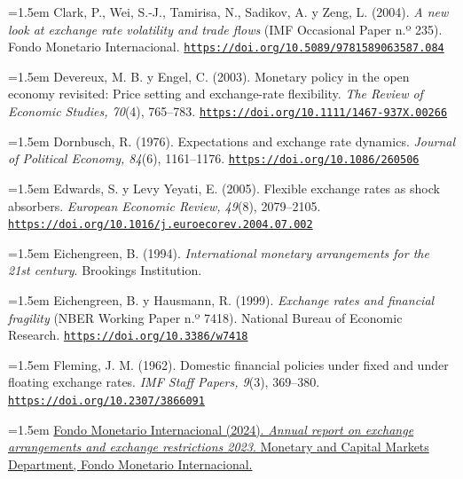 \documentclass[10pt,a4paper]{article}
\begin{document}
\noindent\hangindent=1.5em Clark, P., Wei, S.-J., Tamirisa, N., Sadikov, A. y Zeng, L. (2004). \textit{A new look at exchange rate volatility and trade flows} (IMF Occasional Paper n.º 235). Fondo Monetario Internacional. \href{https://doi.org/10.5089/9781589063587.084}{\nolinkurl{https://doi.org/10.5089/9781589063587.084}}

\noindent\hangindent=1.5em Devereux, M. B. y Engel, C. (2003). Monetary policy in the open economy revisited: Price setting and exchange-rate flexibility. \textit{The Review of Economic Studies, 70}(4), 765--783. \href{https://doi.org/10.1111/1467-937X.00266}{\nolinkurl{https://doi.org/10.1111/1467-937X.00266}}

\noindent\hangindent=1.5em Dornbusch, R. (1976). Expectations and exchange rate dynamics. \textit{Journal of Political Economy, 84}(6), 1161--1176. \href{https://doi.org/10.1086/260506}{\nolinkurl{https://doi.org/10.1086/260506}}

\noindent\hangindent=1.5em Edwards, S. y Levy Yeyati, E. (2005). Flexible exchange rates as shock absorbers. \textit{European Economic Review, 49}(8), 2079--2105. \href{https://doi.org/10.1016/j.euroecorev.2004.07.002}{\nolinkurl{https://doi.org/10.1016/j.euroecorev.2004.07.002}}

\noindent\hangindent=1.5em Eichengreen, B. (1994). \textit{International monetary arrangements for the 21st century}. Brookings Institution.

\noindent\hangindent=1.5em Eichengreen, B. y Hausmann, R. (1999). \textit{Exchange rates and financial fragility} (NBER Working Paper n.º 7418). National Bureau of Economic Research. \href{https://doi.org/10.3386/w7418}{\nolinkurl{https://doi.org/10.3386/w7418}}

\noindent\hangindent=1.5em Fleming, J. M. (1962). Domestic financial policies under fixed and under floating exchange rates. \textit{IMF Staff Papers, 9}(3), 369--380. \href{https://doi.org/10.2307/3866091}{\nolinkurl{https://doi.org/10.2307/3866091}}

\noindent\hangindent=1.5em \href{https://www.imf.org/en/publications/annual-report-on-exchange-arrangements-and-exchange-restrictions/issues/2024/12/19/annual-report-on-exchange-arrangements-and-exchange-restrictions-2023-541890}{Fondo Monetario Internacional (2024). \textit{Annual report on exchange arrangements and exchange restrictions 2023}. Monetary and Capital Markets Department, Fondo Monetario Internacional.}
\end{document}
